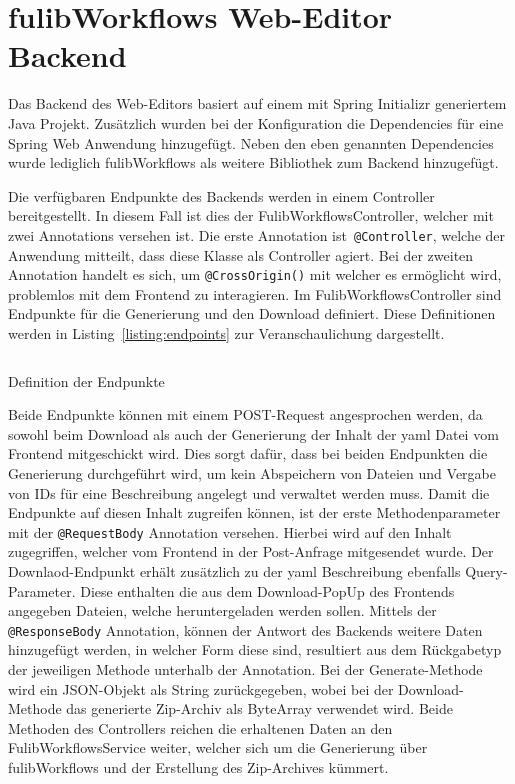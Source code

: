 \section{fulibWorkflows Web-Editor Backend}\label{sec:editor-backend}
Das Backend des Web-Editors basiert auf einem mit Spring Initializr generiertem Java Projekt.
Zusätzlich wurden bei der Konfiguration die Dependencies für eine Spring Web Anwendung hinzugefügt.
Neben den eben genannten Dependencies wurde lediglich fulibWorkflows als weitere Bibliothek zum Backend hinzugefügt.

Die verfügbaren Endpunkte des Backends werden in einem Controller bereitgestellt.
In diesem Fall ist dies der FulibWorkflowsController, welcher mit zwei Annotations versehen ist.
Die erste Annotation ist~\texttt{@Controller}, welche der Anwendung mitteilt, dass diese Klasse als Controller agiert.
Bei der zweiten Annotation handelt es sich, um \texttt{@CrossOrigin()} mit welcher es ermöglicht wird, problemlos mit dem
Frontend zu interagieren.
Im FulibWorkflowsController sind Endpunkte für die Generierung und den Download definiert.
Diese Definitionen werden in Listing~\ref{listing:endpoints} zur Veranschaulichung dargestellt.

\begin{listing}[!ht]
    \inputminted[firstnumber=15]{java}{listings/3.3/Endpoints.java}
    \caption{Definition der Endpunkte}
    \label{listing:endpoints}
\end{listing}

Beide Endpunkte können mit einem POST-Request angesprochen werden, da sowohl beim Download als auch der Generierung der Inhalt der
yaml Datei vom Frontend mitgeschickt wird.
Dies sorgt dafür, dass bei beiden Endpunkten die Generierung durchgeführt wird, um kein Abspeichern von Dateien und Vergabe von IDs für
eine Beschreibung angelegt und verwaltet werden muss.
Damit die Endpunkte auf diesen Inhalt zugreifen können, ist der erste Methodenparameter mit der \texttt{@RequestBody} Annotation versehen.
Hierbei wird auf den Inhalt zugegriffen, welcher vom Frontend in der Post-Anfrage mitgesendet wurde.
Der Downlaod-Endpunkt erhält zusätzlich zu der yaml Beschreibung ebenfalls Query-Parameter.
Diese enthalten die aus dem Download-PopUp des Frontends angegeben Dateien, welche heruntergeladen werden sollen.
Mittels der \texttt{@ResponseBody} Annotation, können der Antwort des Backends weitere Daten hinzugefügt werden, in welcher Form diese
sind, resultiert aus dem Rückgabetyp der jeweiligen Methode unterhalb der Annotation.
Bei der Generate-Methode wird ein JSON-Objekt als String zurückgegeben, wobei bei der Download-Methode das generierte Zip-Archiv als ByteArray verwendet wird.
Beide Methoden des Controllers reichen die erhaltenen Daten an den FulibWorkflowsService weiter, welcher sich um die Generierung über fulibWorkflows
und der Erstellung des Zip-Archives kümmert.

